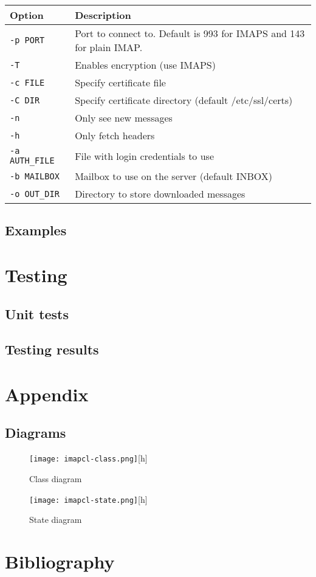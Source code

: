 \documentclass[a4]{report}
\begin{document}
\begin{table}[h]
  \renewcommand*{\arraystretch}{1.0}
  \centering
  \begin{tabular}{|l|l|}
    \hline
    Option & Description\\
    \hline
    \texttt{-p PORT}      & Port to connect to. Default is 993 for IMAPS and 143 for plain IMAP.\\
    \texttt{-T}          & Enables encryption (use IMAPS)\\
    \texttt{-c FILE}     & Specify certificate file\\
    \texttt{-C DIR}      & Specify certificate directory (default /etc/ssl/certs)\\
    \texttt{-n}          & Only see new messages\\
    \texttt{-h}          & Only fetch headers\\
    \texttt{-a AUTH\_FILE}& File with login credentials to use\\
    \texttt{-b MAILBOX}  & Mailbox to use on the server (default INBOX)\\
    \texttt{-o OUT\_DIR}  & Directory to store downloaded messages\\
    \hline
  \end{tabular}
\end{table}

\section{Examples}

\chapter{Testing}

\section{Unit tests}

\section{Testing results}

\chapter{Appendix}

\section{Diagrams}

\begin{figure}
  \centering
  \texttt{[image: imapcl-class.png]}[h]
  \caption{Class diagram}
\end{figure}

\begin{figure}
  \centering
  \texttt{[image: imapcl-state.png]}[h]
  \caption{State diagram}
\end{figure}

\chapter{Bibliography}
\end{document}
